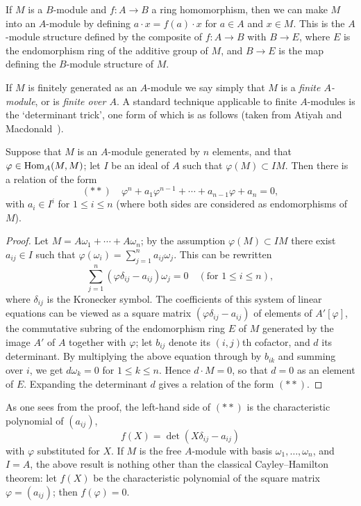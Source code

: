 If $M$ is a $B$-module and $f\colon A \to B$ a ring homomorphism, then
we can make $M$ into an $A$-module by defining $a \cdot x = f(a) \cdot x$ for $a \in A$ and
$x \in M$. This is the $A$-module structure defined by the composite of
$f\colon A \to B$ with $B \to E$, where $E$ is the endomorphism ring of the additive
group of $M$, and $B \to E$ is the map defining the $B$-module structure of $M$.

If $M$ is finitely generated as an $A$-module we say simply that $M$ is a
\emph{finite $A$-module}, or is \emph{finite over $A$}. A standard technique applicable to
finite $A$-modules is the `determinant trick', one form of which is as follows
(taken from Atiyah and Macdonald~\cite{AM}).

\begin{theorem}\label{thm:2.1}
Suppose that $M$ is an $A$-module generated by $n$ elements,
and that $\varphi \in \operatorname{Hom}_A(M, M)$; let $I$ be an ideal of $A$ such that $\varphi(M) \subset IM$.
Then there is a relation of the form
\[
  (**) \quad \varphi^n + a_1\varphi^{n-1} + \cdots + a_{n-1}\varphi + a_n = 0,
\]
with $a_i \in I^i$ for $1 \leq i \leq n$ (where both sides are considered as endomorphisms
of $M$).
\end{theorem}

\begin{proof}
Let $M = A\omega_1 + \cdots + A\omega_n$; by the assumption $\varphi(M) \subset IM$ there exist
$a_{ij} \in I$ such that $\varphi(\omega_i) = \sum_{j=1}^{n} a_{ij}\omega_j$. This can be rewritten
\[
  \sum_{j=1}^{n} (\varphi\delta_{ij} - a_{ij})\omega_j = 0 \quad (\text{for } 1 \leq i \leq n),
\]
where $\delta_{ij}$ is the Kronecker symbol. The coefficients of this system of linear
equations can be viewed as a square matrix $(\varphi\delta_{ij} - a_{ij})$ of elements of $A'[\varphi]$,
the commutative subring of the endomorphism ring $E$ of $M$ generated by
the image $A'$ of $A$ together with $\varphi$; let $b_{ij}$ denote its $(i,j)$th cofactor, and
$d$ its determinant. By multiplying the above equation through by $b_{ik}$ and
summing over $i$, we get $d\omega_k = 0$ for $1 \leq k \leq n$. Hence $d \cdot M = 0$, so that $d = 0$
as an element of $E$. Expanding the determinant $d$ gives a relation of the
form $(**)$.
\end{proof}

\begin{remark}
As one sees from the proof, the left-hand side of $(**)$ is the
characteristic polynomial of $(a_{ij})$,
\[
  f(X) = \det(X\delta_{ij} - a_{ij})
\]
with $\varphi$ substituted for $X$. If $M$ is the free $A$-module with basis
$\omega_1, \ldots, \omega_n$, and $I = A$, the above result is nothing other than the classical
Cayley--Hamilton theorem: let $f(X)$ be the characteristic polynomial of
the square matrix $\varphi = (a_{ij})$; then $f(\varphi) = 0$.
\end{remark}

